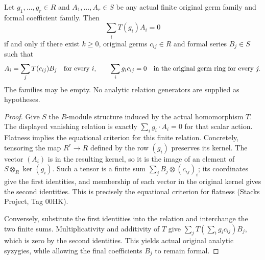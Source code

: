 \begin{theorem}
\label{hir:actual-formal-relations-original-analytic-syzygies}
\leanok
Let $g_1,\ldots,g_r\in R$ and $A_1,\ldots,A_r\in S$ be any actual
finite original germ family and formal coefficient family. Then
\[
 \sum_i T(g_i)A_i=0
\]
if and only if there exist $k\geq0$, original germs $c_{ij}\in R$ and
formal series $B_j\in S$ such that
\[
 A_i=\sum_j T(c_{ij})B_j\quad\hbox{for every }i,
 \qquad \sum_i g_i c_{ij}=0\quad\hbox{in the original germ ring for every }j.
\]
The families may be empty. No analytic relation generators are supplied
as hypotheses.
\end{theorem}
\begin{proof}
Give $S$ the $R$-module structure induced by the actual homomorphism $T$.
The displayed vanishing relation is exactly $\sum_i g_i\mathbin{\cdot}A_i=0$
for that scalar action. Flatness implies the equational criterion for this
finite relation. Concretely, tensoring the map $R^r\to R$ defined by the
row $(g_i)$ preserves its kernel. The vector $(A_i)$ is in the resulting
kernel, so it is the image of an element of $S\otimes_R\ker(g_i)$.
Such a tensor is a finite sum $\sum_j B_j\otimes(c_{ij})_i$; its coordinates
give the first identities, and membership of each vector in the original
kernel gives the second identities. This is precisely the equational
criterion for flatness (Stacks Project, Tag 00HK).

Conversely, substitute the first identities into the relation and interchange
the two finite sums. Multiplicativity and additivity of $T$ give
$\sum_j T(\sum_i g_ic_{ij})B_j$, which is zero by the second identities.
This yields actual original analytic syzygies, while allowing the final
coefficients $B_j$ to remain formal.
\end{proof}

